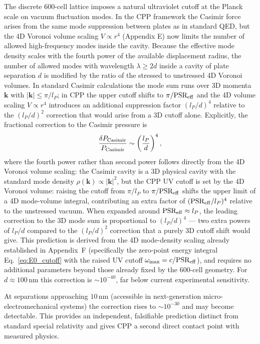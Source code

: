 \documentclass[11pt,letterpaper]{article}
\begin{document}
The discrete 600-cell lattice imposes a natural ultraviolet cutoff at the Planck scale on vacuum fluctuation modes. In the CPP framework the Casimir force arises from the same mode suppression between plates as in standard QED, but the 4D Voronoi volume scaling $V \propto r^4$ (Appendix E) now limits the number of allowed high-frequency modes inside the cavity. Because the effective mode density scales with the fourth power of the 
available displacement radius, the number of allowed modes with wavelength 
$\lambda \geq 2d$ inside a cavity of plate separation $d$ is modified by the 
ratio of the stressed to unstressed 4D Voronoi volumes. In standard Casimir 
calculations the mode sum runs over 3D momenta $\mathbf{k}$ with 
$|\mathbf{k}| \leq \pi/l_P$; in CPP the upper cutoff shifts to 
$\pi/\text{PSR}_{\rm eff}$ and the 4D volume scaling $V \propto r^4$ 
introduces an additional suppression factor $(l_P/d)^4$ relative to the 
$(l_P/d)^2$ correction that would arise from a 3D cutoff alone. Explicitly, 
the fractional correction to the Casimir pressure is
\[
\frac{\delta P_{\rm Casimir}}{P_{\rm Casimir}} \sim \left(\frac{l_P}{d}\right)^4,
\]
where the fourth power rather than second power follows directly from the 4D Voronoi volume scaling: the Casimir cavity is a 3D physical cavity with the standard mode density $\rho(\mathbf{k}) \propto |\mathbf{k}|^2$, but the CPP UV cutoff is set by the 4D Voronoi volume: raising the cutoff from $\pi/l_P$ to $\pi/\text{PSR}_{\rm eff}$ shifts the upper limit of a 4D mode-volume integral, contributing an extra factor of $(\text{PSR}_{\rm eff}/l_P)^4$ relative to the unstressed vacuum. When expanded around $\text{PSR}_{\rm eff} \approx l_P$, the leading correction to the 3D mode sum is proportional to $(l_P/d)^4$ — two extra powers of $l_P/d$ compared to the $(l_P/d)^2$ correction that a purely 3D cutoff shift would give. This prediction is derived from the 4D mode-density scaling already 
established in Appendix~F (specifically the zero-point energy integral 
Eq.~\eqref{eq:E0_cutoff} with the raised UV cutoff 
$\omega_{\max} = c/\text{PSR}_{\rm eff}$), and requires no additional 
parameters beyond those already fixed by the 600-cell geometry. For 
$d \approx 100\,\text{nm}$ this correction is $\sim 10^{-40}$, far below 
current experimental sensitivity. 

At separations approaching $10\,\text{nm}$ (accessible in next-generation micro-electromechanical systems) the correction rises to $\sim 10^{-30}$ and may become detectable. This provides an independent, falsifiable prediction distinct from standard special relativity and gives CPP a second direct contact point with measured physics.
\end{document}
